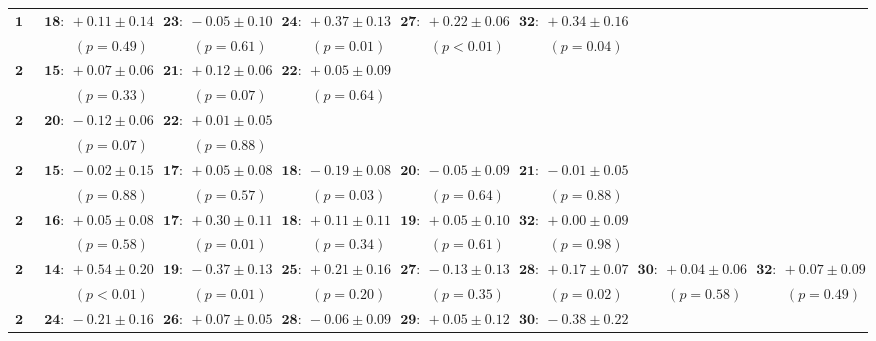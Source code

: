\begin{landscape}
\begin{table}[p]
\begin{tabular}{r|rrrrrrr}
\( \mathbf{19} \) \vspace{-0.7ex} & \( \mathbf{18:}~+0.11 \pm 0.14 \)& \( \mathbf{23:}~-0.05 \pm 0.10 \)& \( \mathbf{24:}~+0.37 \pm 0.13 \)& \( \mathbf{27:}~+0.22 \pm 0.06 \)& \( \mathbf{32:}~+0.34 \pm 0.16 \)\\ 
 & \( (p={0.49}) \)& \( (p={0.61}) \)& \( (p={0.01}) \)& \( (p<0.01) \)& \( (p={0.04}) \)\\ 
\( \mathbf{20} \) \vspace{-0.7ex} & \( \mathbf{15:}~+0.07 \pm 0.06 \)& \( \mathbf{21:}~+0.12 \pm 0.06 \)& \( \mathbf{22:}~+0.05 \pm 0.09 \)\\ 
 & \( (p={0.33}) \)& \( (p={0.07}) \)& \( (p={0.64}) \)\\ 
\( \mathbf{21} \) \vspace{-0.7ex} & \( \mathbf{20:}~-0.12 \pm 0.06 \)& \( \mathbf{22:}~+0.01 \pm 0.05 \)\\ 
 & \( (p={0.07}) \)& \( (p={0.88}) \)\\ 
\( \mathbf{22} \) \vspace{-0.7ex} & \( \mathbf{15:}~-0.02 \pm 0.15 \)& \( \mathbf{17:}~+0.05 \pm 0.08 \)& \( \mathbf{18:}~-0.19 \pm 0.08 \)& \( \mathbf{20:}~-0.05 \pm 0.09 \)& \( \mathbf{21:}~-0.01 \pm 0.05 \)\\ 
 & \( (p={0.88}) \)& \( (p={0.57}) \)& \( (p={0.03}) \)& \( (p={0.64}) \)& \( (p={0.88}) \)\\ 
\( \mathbf{23} \) \vspace{-0.7ex} & \( \mathbf{16:}~+0.05 \pm 0.08 \)& \( \mathbf{17:}~+0.30 \pm 0.11 \)& \( \mathbf{18:}~+0.11 \pm 0.11 \)& \( \mathbf{19:}~+0.05 \pm 0.10 \)& \( \mathbf{32:}~+0.00 \pm 0.09 \)\\ 
 & \( (p={0.58}) \)& \( (p={0.01}) \)& \( (p={0.34}) \)& \( (p={0.61}) \)& \( (p={0.98}) \)\\ 
\( \mathbf{24} \) \vspace{-0.7ex} & \( \mathbf{14:}~+0.54 \pm 0.20 \)& \( \mathbf{19:}~-0.37 \pm 0.13 \)& \( \mathbf{25:}~+0.21 \pm 0.16 \)& \( \mathbf{27:}~-0.13 \pm 0.13 \)& \( \mathbf{28:}~+0.17 \pm 0.07 \)& \( \mathbf{30:}~+0.04 \pm 0.06 \)& \( \mathbf{32:}~+0.07 \pm 0.09 \)\\ 
 & \( (p<0.01) \)& \( (p={0.01}) \)& \( (p={0.20}) \)& \( (p={0.35}) \)& \( (p={0.02}) \)& \( (p={0.58}) \)& \( (p={0.49}) \)\\ 
\( \mathbf{25} \) \vspace{-0.7ex} & \( \mathbf{24:}~-0.21 \pm 0.16 \)& \( \mathbf{26:}~+0.07 \pm 0.05 \)& \( \mathbf{28:}~-0.06 \pm 0.09 \)& \( \mathbf{29:}~+0.05 \pm 0.12 \)& \( \mathbf{30:}~-0.38 \pm 0.22 \)\\ 

\end{tabular}
\end{table}
\end{landscape}
